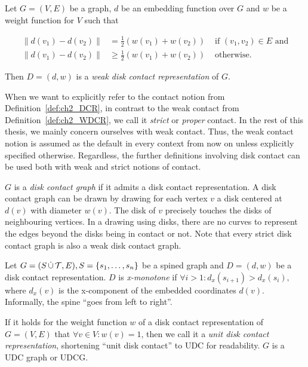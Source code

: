 \begin{definition}
\label{def:ch2_WDCR}
Let $G = (V, E)$ be a graph, $d$ be an embedding function over $G$ and $w$ be a weight function for $V$ such that

\begin{align*}
\lVert d(v_1) - d(v_2) \rVert &= \frac12(w(v_1) + w(v_2)) &\text{ if } (v_1, v_2) \in E \text{ and} \\ \lVert d(v_1) - d(v_2) \rVert &\ge \frac12(w(v_1) + w(v_2)) &\text{ otherwise.}
\end{align*}

Then $D = (d, w)$ is a \emph{weak disk contact representation} of $G$.
\end{definition}

When we want to explicitly refer to the contact notion from Definition~\ref{def:ch2_DCR}, in contrast to the weak contact from Definition~\ref{def:ch2_WDCR}, we call it \emph{strict} or \emph{proper} contact. In the rest of this thesis, we mainly concern ourselves with weak contact. Thus, the weak contact notion is assumed as the default in every context from now on unless explicitly specified otherwise. Regardless, the further definitions involving disk contact can be used both with weak and strict notions of contact.

$G$ is a \emph{disk contact graph} if it admits a disk contact representation. A disk contact graph can be drawn by drawing for each vertex $v$ a disk centered at $d(v)$ with diameter $w(v)$. The disk of $v$ precisely touches the disks of neighbouring vertices. In a drawing using disks, there are no curves to represent the edges beyond the disks being in contact or not. Note that every strict disk contact graph is also a weak disk contact graph.

Let $G = (S \,\dot{\cup}\, \mathcal T, E), S = \{ s_1, \ldots, s_n \}$ be a spined graph and $D = (d, w)$ be a disk contact representation. $D$ is \emph{x-monotone} if $\forall i > 1: d_x(s_{i+1}) > d_x(s_i),$ where $d_x(v)$ is the x-component of the embedded coordinates $d(v)$. Informally, the spine ``goes from left to right''.

If it holds for the weight function $w$ of a disk contact representation of $G = (V, E)$ that $\forall v\in V: w(v) = 1$, then we call it a \emph{unit disk contact representation}, shortening ``unit disk contact'' to UDC for readability. $G$ is a UDC graph or UDCG.

